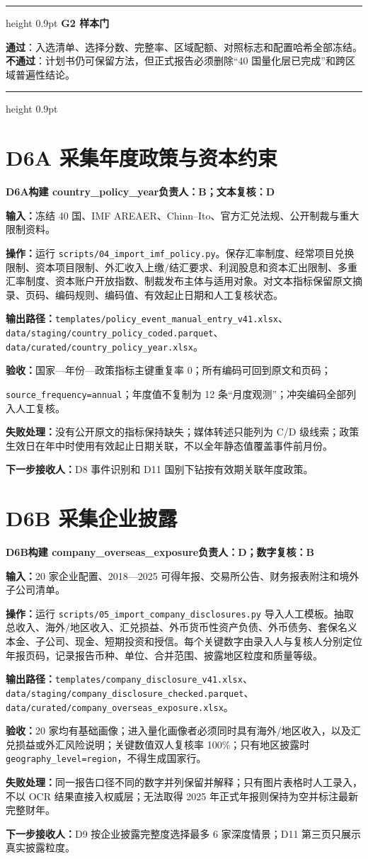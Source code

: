 \documentclass[UTF8,fontset=windows,12pt,openany]{ctexbook}
\newenvironment{gatebox}[1][]{%
  \par\medskip\noindent\begin{center}\begin{minipage}{0.93\textwidth}%
  \color{GoldLine}\hrule height 0.9pt\vspace{0.45em}%
  \textbf{#1}\par\smallskip\color{black}%
}{%
  \par\vspace{0.35em}\color{GoldLine}\hrule height 0.9pt%
  \end{minipage}\end{center}\medskip%
}
\newcommand{\Field}[1]{{\small\nolinkurl{#1}}}
\newcommand{\File}[1]{{\small\begingroup\urlstyle{same}\nolinkurl{#1}\endgroup}}
\newcommand{\StepTitle}[3]{%
  \noindent\colorbox{DeepNavy}{\parbox{0.965\textwidth}{\color{white}\Large\bfseries #1\quad #2\hfill\normalsize #3}}\par\medskip
}
\newcommand{\CardRow}[2]{\noindent\textbf{#1：}#2\par}
\newcommand{\Pass}{\textcolor{DeepNavy}{\textbf{通过}}}
\newcommand{\Fail}{\textcolor{TextGray}{\textbf{不通过}}}
\begin{document}
\begin{gatebox}[G2 样本门]
\Pass：入选清单、选择分数、完整率、区域配额、对照标志和配置哈希全部冻结。\Fail：计划书仍可保留方法，但正式报告必须删除“40 国量化层已完成”和跨区域普遍性结论。
\end{gatebox}

\newpage
\section{D6A 采集年度政策与资本约束}
\StepTitle{D6A}{构建 country\_policy\_year}{负责人：B；文本复核：D}
\CardRow{输入}{冻结 40 国、IMF AREAER、Chinn--Ito、官方汇兑法规、公开制裁与重大限制资料。}
\CardRow{操作}{运行 \File{scripts/04_import_imf_policy.py}。保存汇率制度、经常项目兑换限制、资本项目限制、外汇收入上缴/结汇要求、利润股息和资本汇出限制、多重汇率制度、资本账户开放指数、制裁发布主体与适用对象。对文本指标保留原文摘录、页码、编码规则、编码值、有效起止日期和人工复核状态。}
\CardRow{输出路径}{\File{templates/policy_event_manual_entry_v41.xlsx}、\File{data/staging/country_policy_coded.parquet}、\File{data/curated/country_policy_year.xlsx}。}
\CardRow{验收}{国家—年份—政策指标主键重复率 0；所有编码可回到原文和页码；\par\Field{source_frequency=annual}；年度值不复制为 12 条“月度观测”；冲突编码全部列入人工复核。}
\CardRow{失败处理}{没有公开原文的指标保持缺失；媒体转述只能列为 C/D 级线索；政策生效日在年中时使用有效起止日期关联，不以全年静态值覆盖事件前月份。}
\CardRow{下一步接收人}{D8 事件识别和 D11 国别下钻按有效期关联年度政策。}

\section{D6B 采集企业披露}
\StepTitle{D6B}{构建 company\_overseas\_exposure}{负责人：D；数字复核：B}
\CardRow{输入}{20 家企业配置、2018—2025 可得年报、交易所公告、财务报表附注和境外子公司清单。}
\CardRow{操作}{运行 \File{scripts/05_import_company_disclosures.py} 导入人工模板。抽取总收入、海外/地区收入、汇兑损益、外币货币性资产负债、外币债务、套保名义本金、子公司、现金、短期投资和授信。每个关键数字由录入人与复核人分别定位年报页码，记录报告币种、单位、合并范围、披露地区粒度和质量等级。}
\CardRow{输出路径}{\File{templates/company_disclosure_v41.xlsx}、\File{data/staging/company_disclosure_checked.parquet}、\File{data/curated/company_overseas_exposure.xlsx}。}
\CardRow{验收}{20 家均有基础画像；进入量化画像者必须同时具有海外/地区收入，以及汇兑损益或外汇风险说明；关键数值双人复核率 100\%；只有地区披露时 \Field{geography_level=region}，不得生成国家行。}
\CardRow{失败处理}{同一报告口径不同的数字并列保留并解释；只有图片表格时人工录入，不以 OCR 结果直接入权威层；无法取得 2025 年正式年报则保持为空并标注最新完整财年。}
\CardRow{下一步接收人}{D9 按企业披露完整度选择最多 6 家深度情景；D11 第三页只展示真实披露粒度。}
\end{document}
